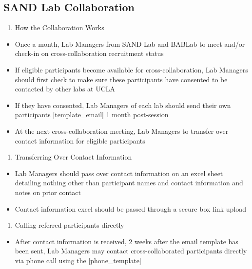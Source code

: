 \documentclass[
]{book}
\providecommand{\tightlist}{%
  \setlength{\itemsep}{0pt}\setlength{\parskip}{0pt}}
\begin{document}
\hypertarget{sand-lab-collaboration}{%
\subsection{SAND Lab Collaboration}\label{sand-lab-collaboration}}

\begin{enumerate}
\def\labelenumi{\arabic{enumi}.}
\tightlist
\item
  How the Collaboration Works
\end{enumerate}

\begin{itemize}
\tightlist
\item
  Once a month, Lab Managers from SAND Lab and BABLab to meet and/or check-in on cross-collaboration recruitment status
\item
  If eligible participants become available for cross-collaboration, Lab Managers should first check to make sure these participants have consented to be contacted by other labs at UCLA
\item
  If they have consented, Lab Managers of each lab should send their own participants {[}template\_email{]} 1 month post-session
\item
  At the next cross-collaboration meeting, Lab Managers to transfer over contact information for eligible participants
\end{itemize}

\begin{enumerate}
\def\labelenumi{\arabic{enumi}.}
\setcounter{enumi}{1}
\tightlist
\item
  Transferring Over Contact Information
\end{enumerate}

\begin{itemize}
\tightlist
\item
  Lab Managers should pass over contact information on an excel sheet detailing nothing other than participant names and contact information and notes on prior contact
\item
  Contact information excel should be passed through a secure box link upload
\end{itemize}

\begin{enumerate}
\def\labelenumi{\arabic{enumi}.}
\setcounter{enumi}{2}
\tightlist
\item
  Calling referred participants directly
\end{enumerate}

\begin{itemize}
\tightlist
\item
  After contact information is received, 2 weeks after the email template has been sent, Lab Managers may contact cross-collaborated participants directly via phone call using the {[}phone\_template{]}
\end{itemize}
\end{document}
